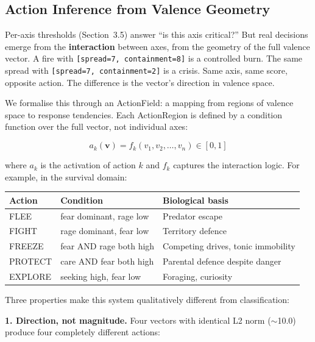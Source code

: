 \documentclass[11pt]{article}
\begin{document}
\subsection{Action Inference from Valence Geometry}

Per-axis thresholds (Section~3.5) answer ``is this axis critical?'' But real decisions emerge from the \textbf{interaction} between axes, from the geometry of the full valence vector. A fire with \texttt{[spread=7, containment=8]} is a controlled burn. The same spread with \texttt{[spread=7, containment=2]} is a crisis. Same axis, same score, opposite action. The difference is the vector's direction in valence space.

We formalise this through an ActionField: a mapping from regions of valence space to response tendencies. Each ActionRegion is defined by a condition function over the full vector, not individual axes:

\begin{equation}
a_k(\mathbf{v}) = f_k(v_1, v_2, \ldots, v_n) \in [0, 1]
\end{equation}

\noindent where $a_k$ is the activation of action $k$ and $f_k$ captures the interaction logic. For example, in the survival domain:

\begin{table}[h]
\centering
\begin{tabular}{lll}
\toprule
\textbf{Action} & \textbf{Condition} & \textbf{Biological basis} \\
\midrule
FLEE & fear dominant, rage low & Predator escape \\
FIGHT & rage dominant, fear low & Territory defence \\
FREEZE & fear AND rage both high & Competing drives, tonic immobility \\
PROTECT & care AND fear both high & Parental defence despite danger \\
EXPLORE & seeking high, fear low & Foraging, curiosity \\
\bottomrule
\end{tabular}
\end{table}

Three properties make this system qualitatively different from classification:

\textbf{1. Direction, not magnitude.} Four vectors with identical L2 norm ($\sim$10.0) produce four completely different actions:
\end{document}

